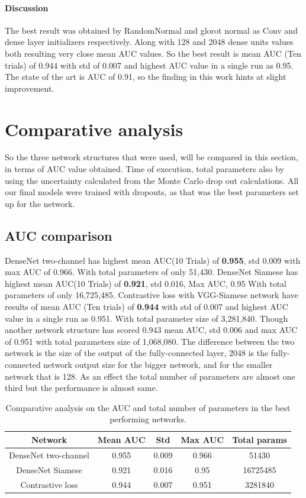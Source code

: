 \paragraph{Discussion }
The best result was obtained by RandomNormal and glorot normal as Conv and dense layer initializers respectively. Along with 128 and 2048 dense units values both resulting very close mean AUC values. So the best
result is mean AUC (Ten trials) of 0.944 with std of 0.007 and highest AUC value in a single run as 0.95. The state of the art is AUC of 0.91, so the finding in this work hints at slight improvement.

\newpage

\section{Comparative analysis}
So the three network structures that were used, will be compared in this section, in terms of AUC value obtained. Time of execution, total parameters also by using the uncertainty calculated from the Monte Carlo 
drop out calculations. All our final models were trained with dropouts, as that was the best parameters set up for the network. 

\subsection{AUC comparison}
DenseNet two-channel has highest mean AUC(10 Trials) of \textbf{0.955}, std 0.009 with max AUC of 0.966. With total parameters of only 51,430. 
DenseNet Siamese has highest mean AUC(10 Trials) of \textbf{0.921}, std 0.016, Max AUC, 0.95 With total parameters of only 16,725,485. 
Contrastive loss with VGG-Siamese network have results of mean AUC (Ten trials) of \textbf{0.944} with std of 0.007 and highest AUC value in a single run as 0.951. With total parameter size of 3,281,840. Though another 
network structure has scored 0.943 mean AUC, std 0.006 and max AUC of 0.951 with total parameters size of 1,068,080. The difference between the two network is the size of the output of the fully-connected layer, 2048 is 
the fully-connected network output size for the bigger network, and for the smaller network that is 128. As an effect the total number of parameters are almost one third but the performance is almost same. 

\begin{center}
\begin{table}
\begin{tabular}{|c c c c c|} 
 \hline\hline
 Network & Mean AUC & Std & Max AUC & Total params\\ \hline
 DenseNet two-channel & 0.955 & 0.009 & 0.966 & 51430\\
 DenseNet Siamese & 0.921 & 0.016 & 0.95 & 16725485 \\
 Contrastive loss & 0.944 & 0.007 & 0.951 & 3281840\\ \hline \hline
 \end{tabular}
 \caption{Comparative analysis on the AUC and total number of parameters in the best performing networks.}
\label{table:comparative_auc_results}
\end{table}
\end{center}

